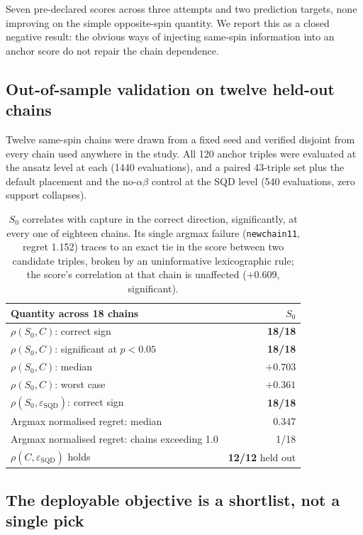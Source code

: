 \documentclass[11pt,a4paper]{article}
\begin{document}
Seven pre-declared scores across three attempts and two prediction targets,
none improving on the simple opposite-spin quantity. We report this as a
closed negative result: the obvious ways of injecting same-spin information
into an anchor score do not repair the chain dependence.

\FloatBarrier
\subsection{Out-of-sample validation on twelve held-out chains}
\label{sec:heldout}

Twelve  same-spin chains were drawn from a fixed seed and verified
disjoint from every chain used anywhere in the study. All 120 anchor triples
were evaluated at the ansatz level at each (1440 evaluations), and a paired
43-triple set plus the default placement and the no-$\alpha\beta$ control at
the SQD level (540 evaluations, zero support collapses).

\begin{table}[htbp]\centering\small
\begin{tabular}{lr}
\toprule
Quantity across 18 chains & $S_0$\\
\midrule
$\rho(S_0, C)$: correct sign & \textbf{18/18}\\
$\rho(S_0, C)$: significant at $p<0.05$ & \textbf{18/18}\\
$\rho(S_0, C)$: median & $+0.703$\\
$\rho(S_0, C)$: worst case & $+0.361$\\
$\rho(S_0, \varepsilon_{\text{SQD}})$: correct sign & \textbf{18/18}\\
Argmax normalised regret: median & 0.347\\
Argmax normalised regret: chains exceeding 1.0 & 1/18\\
$\rho(C, \varepsilon_{\text{SQD}})$ holds & \textbf{12/12} held out\\
\bottomrule
\end{tabular}
\caption{$S_0$ correlates with capture in the correct direction, significantly,
at every one of eighteen chains. Its single argmax failure
(\texttt{newchain11}, regret 1.152) traces to an exact tie in the score
between two candidate triples, broken by an uninformative lexicographic rule;
the score's correlation at that chain is unaffected ($+0.609$, significant).}
\end{table}

\FloatBarrier
\subsection{The deployable objective is a shortlist, not a single pick}
\label{sec:shortlist}
\end{document}
